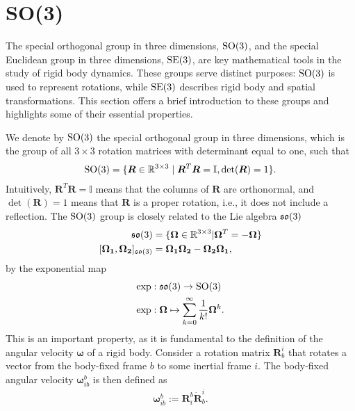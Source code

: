 \section{SO(3)}
\label{sec:bp:so3_se3}

The special orthogonal group in three dimensions, $\operatorname{SO}(3)$, and the special
Euclidean group in three dimensions, $\operatorname{SE}(3)$, are key mathematical tools in the
study of rigid body dynamics. These groups serve distinct purposes: $\operatorname{SO}(3)$ is
used to represent rotations, while $\operatorname{SE}(3)$ describes rigid body and spatial
transformations. This section offers a brief introduction to these groups and
highlights some of their essential properties.

We denote by $\operatorname{SO}(3)$ the special orthogonal group in three dimensions, which is
the group of all $3 \times 3$ rotation matrices with determinant equal to one,
such that
\begin{align}
    \operatorname{SO}(3) = \{ \bm{R} \in \mathbb{R}^{3 \times 3} \mid \bm{R}^T \bm{R} = \mathbb{I}, \det(\bm{R}) = 1 \}.
\end{align}
Intuitively, $\bm{R}^T \bm{R} = \mathbb{I}$ means that the columns of $\bm{R}$ are orthonormal,
and $\det(\bm{R}) = 1$ means that $\bm{R}$ is a proper rotation, i.e., it does not include
a reflection. The $\operatorname{SO}(3)$ group is closely related to the Lie algebra $\mathfrak{so}(3)$
\begin{subequations}
\begin{align}
    \mathfrak{so}(3) &= \{ \bm{\Omega} \in \mathbb{R}^{3 \times 3} | \bm{\Omega}^T = -\bm{\Omega} \} \\
    [\bm{\Omega_1}, \bm{\Omega_2}]_{\mathfrak{so}(3)} &= \bm{\Omega_1} \bm{\Omega_2}
        - \bm{\Omega_2} \bm{\Omega_1},
\end{align}
\end{subequations}
by the exponential map
\begin{subequations}
\begin{align}
    \exp &: \mathfrak{so}(3) \to \operatorname{SO}(3) \\
    \exp &: \bm{\Omega} \mapsto \sum_{k=0}^{\infty} \frac{1}{k!} \bm{\Omega}^k.
\end{align}
\end{subequations}
This is an important property, as it is fundamental to the definition of the
angular velocity $\bm{\omega}$ of a rigid body. Consider a rotation matrix
$\bm{R}_b^i$ that rotates a vector from the body-fixed frame $b$ to some inertial
frame $i$. The body-fixed angular velocity $\bm{\omega}_{ib}^b$ is then defined
as
\begin{align}
    \bm{\omega}_{ib}^b := \bm{R}_i^b \dot{\bm{R}}_b^i.
\end{align}
